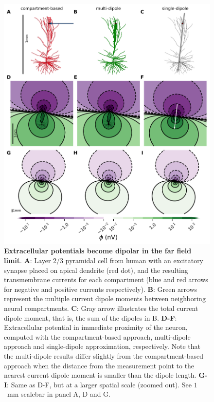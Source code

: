 \documentclass[preprint,10pt,authoryear]{elsarticle}
\begin{document}
\begin{figure}[H]
	\centering
	\includegraphics[width=1.0\textwidth]{fig_dipole_field_passiveTrue_single_syn579}
	\caption{\textbf{Extracellular potentials become dipolar in the far field limit}. 
	\textbf{A}: Layer 2/3 pyramidal cell from human \citep{EYAL2016} with an excitatory synapse placed on apical dendrite (red dot), and the resulting transmembrane currents for each compartment (blue and red arrows for negative and positive currents respectively).
	\textbf{B}: Green arrows represent the multiple current dipole moments between neighboring neural compartments.
	\textbf{C}: Gray arrow illustrates the total current dipole moment, that is, the sum of the dipoles in B.
	\textbf{D-F}: Extracellular potential in immediate proximity of the neuron, computed with the compartment-based approach, multi-dipole approach and single-dipole approximation, respectively. Note that the multi-dipole results differ slightly from the compartment-based approach when the distance from the measurement point to the nearest current dipole moment is smaller than the dipole length.
	\textbf{G-I}: Same as D-F, but at a larger spatial scale (zoomed out). See $1$~mm scalebar in panel A, D and G.
	}
	\label{fig:dipole_field}
\end{figure}
\end{document}

